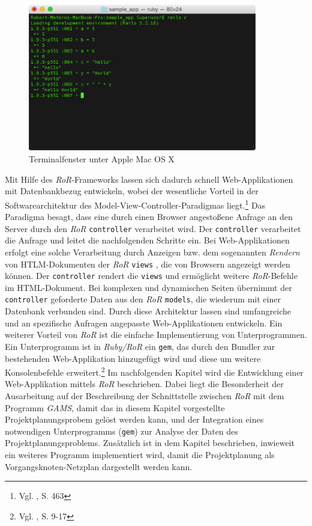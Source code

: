 \documentclass[a4paper,12pt,parskip,bibtotoc,liststotoc]{article}
\begin{document}
\begin{figure}[h!]
  \begin{center}
\includegraphics[width=100mm]{Bilder/Terminal.pdf}
    \caption{Terminalfenster unter Apple Mac OS X}  \label{Terminal}
  \end{center}
\end{figure}

Mit Hilfe des \textit{RoR}-Frameworks lassen sich dadurch schnell Web-Applikationen mit Datenbankbezug entwickeln, wobei der wesentliche Vorteil in der Softwarearchitektur des Model-View-Controller-Paradigmas liegt.\footnote{Vgl. \cite{walter2008ruby}, S. 463} Das Paradigma besagt, dass eine durch einen Browser angestoßene Anfrage an den Server durch den \textit{RoR} \texttt{controller} verarbeitet wird. Der \texttt{controller} verarbeitet die Anfrage und leitet die nachfolgenden Schritte ein. Bei Web-Applikationen erfolgt eine solche Verarbeitung durch Anzeigen bzw. dem sogenannten \textit{Rendern} von HTLM-Dokumenten der \textit{RoR} \texttt{views} , die von Browsern angezeigt werden können. Der \texttt{controller} rendert die \texttt{views} und ermöglicht weitere \textit{RoR}-Befehle im HTML-Dokument. Bei komplexen und dynamischen Seiten übernimmt der \texttt{controller} geforderte Daten aus den \textit{RoR} \texttt{models}, die wiederum mit einer Datenbank verbunden sind. Durch diese Architektur lassen sind umfangreiche und an spezifische Anfragen angepasste Web-Applikationen entwickeln. Ein weiterer Vorteil von \textit{RoR} ist die einfache Implementierung von Unterprogrammen. Ein Unterprogramm ist in \textit{Ruby/RoR} ein \texttt{gem}, das durch den Bundler zur bestehenden Web-Applikation hinzugefügt wird und diese um weitere Konsolenbefehle erweitert.\footnote{Vgl. \cite{hartl2012ruby}, S. 9-17} Im nachfolgenden Kapitel wird die Entwicklung einer Web-Applikation mittels \textit{RoR} beschrieben. Dabei liegt die Besonderheit der Ausarbeitung auf der Beschreibung der Schnittstelle zwischen \textit{RoR} mit dem Programm \textit{GAMS}, damit das in diesem Kapitel vorgestellte Projektplanungsprobem gelöst werden kann, und der Integration eines notwendigen Unterprogramms (\texttt{gem}) zur Analyse der Daten des Projektplanungsproblems. Zusätzlich ist in dem Kapitel beschrieben, inwieweit ein weiteres Programm implementiert wird, damit die Projektplanung als Vorgangsknoten-Netzplan dargestellt werden kann.
\end{document}
